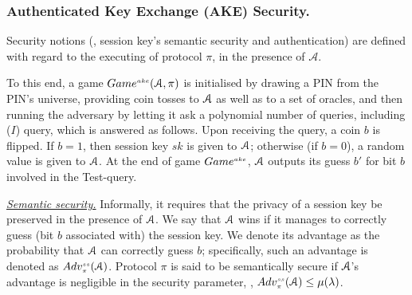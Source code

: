%
%
%
%
%
%
%
%
%
%
%
%
%
%  
%  
%  

 \vspace{-1mm}
\subsubsection{Authenticated Key Exchange (AKE)  Security.} Security notions (\ie, session key's semantic security and authentication) are defined with regard to the executing of protocol $\pi$, in the presence of   $\mathcal{A}$. 


To this end, a game $Game^{\scriptscriptstyle ake} (\mathcal{A},\pi)$ is initialised by drawing a PIN  from the PIN's universe,
providing coin tosses to $\mathcal{A}$ as well as to a set of oracles, and then running the adversary by letting it ask a polynomial
number of queries, including \test($I$) query, which is answered as follows. Upon receiving the query, a coin $b$ is flipped. If $b=1$, then session key $sk$ is given to $\mathcal{A}$; otherwise (if $b=0$), a random value is given to $\mathcal{A}$. At the end of game $Game^{\scriptscriptstyle ake}$, $\mathcal{A}$  outputs its guess $b'$ for  bit $b$ involved in the Test-query. 



\noindent\underline{\textit{Semantic security.}} Informally, it requires that the privacy of a session key be preserved in the presence of $\mathcal{A}$. We say that $\mathcal{A}$  wins if it manages to correctly guess (bit $b$ associated with) the session key. We denote its advantage as the probability that $\mathcal{A}$  can correctly guess $b$; specifically, such an advantage is denoted as  $Adv_{\scriptscriptstyle\pi}^{\scriptscriptstyle ss}(\mathcal{A})$.  Protocol $\pi$ is said to be semantically secure if $\mathcal{A}$'s advantage is negligible in the security parameter, \ie, $Adv_{\scriptscriptstyle\pi}^{\scriptscriptstyle ss}(\mathcal{A})\leq \mu(\lambda)$.



